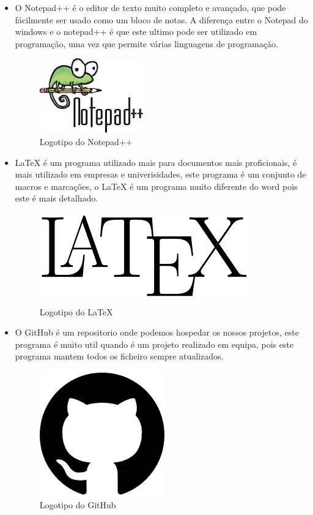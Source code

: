 \documentclass[11pt]{report}
\begin{document}
\begin{itemize}
\item O Notepad++ é o editor de texto muito completo e avançado, que pode fácilmente ser usado como um bloco de notas.
A diferença entre o Notepad do windows e o notepad++ é que este ultimo pode ser utilizado em programação, uma vez que permite várias linguagens de programação.
\begin{figure}
\centering
\includegraphics{note.jpg}
\caption{Logotipo do Notepad++}
\end{figure}

\item LaTeX é um programa utilizado mais para documentos mais proficionais, é mais utilizado em empresas e univerisidades, este programa é um conjunto de macros e marcações, o LaTeX é um programa muito diferente do word pois este é mais detalhado.
\begin{figure}
\centering
\includegraphics{LaTeX.png}
\caption{Logotipo do LaTeX}
\end{figure}

\item O GitHub é um repositorio onde podemos hospedar os nossos projetos, este programa é muito util quando é um projeto realizado em equipa, pois este programa mantem todos os ficheiro sempre atualizados. 
\begin{figure}
\centering
\includegraphics{Git.png}
\caption{Logotipo do GitHub}
\end{figure}
\end{itemize}
\end{document}
